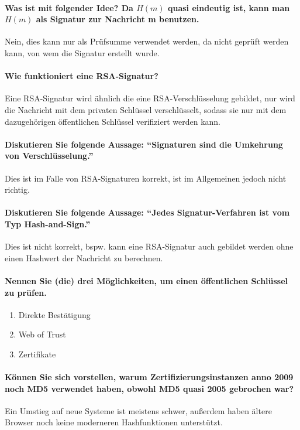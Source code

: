 \paragraph{Was ist mit folgender Idee? Da \(H(m)\) quasi eindeutig ist, kann man \(H(m)\) als Signatur zur Nachricht m benutzen.}
Nein, dies kann nur als Prüfsumme verwendet werden, da nicht geprüft werden kann, von wem die Signatur erstellt wurde.

\paragraph{Wie funktioniert eine RSA-Signatur?}
Eine RSA-Signatur wird ähnlich die eine RSA-Verschlüsselung gebildet, nur wird die Nachricht mit dem privaten Schlüssel verschlüsselt, sodass sie nur mit dem dazugehörigen öffentlichen Schlüssel verifiziert werden kann.

\paragraph{Diskutieren Sie folgende Aussage: \enquote{Signaturen sind die Umkehrung von Verschlüsselung.}}
Dies ist im Falle von RSA-Signaturen korrekt, ist im Allgemeinen jedoch nicht richtig.

\paragraph{Diskutieren Sie folgende Aussage: \enquote{Jedes Signatur-Verfahren ist vom Typ Hash-and-Sign.}}
Dies ist nicht korrekt, bspw. kann eine RSA-Signatur auch gebildet werden ohne einen Hashwert der Nachricht zu berechnen.

\paragraph{Nennen Sie (die) drei Möglichkeiten, um einen öffentlichen Schlüssel zu prüfen.}
\begin{enumerate}
	\item Direkte Bestätigung
	\item Web of Trust
	\item Zertifikate
\end{enumerate}

\paragraph{Können Sie sich vorstellen, warum Zertifizierungsinstanzen anno 2009 noch MD5 verwendet haben, obwohl MD5 quasi 2005 gebrochen war?}
Ein Umstieg auf neue Systeme ist meistens schwer, außerdem haben ältere Browser noch keine moderneren Hashfunktionen unterstützt.

